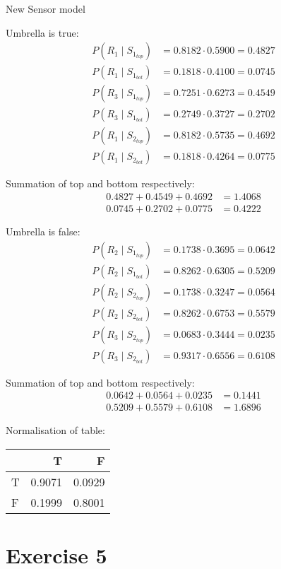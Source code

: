\documentclass[colorlinks=true,linkcolor=blue]{article}
\begin{document}
New Sensor model

Umbrella is true:
\begin{align*}
P(R_1 \mid S_{1_{top}}) &= 0.8182 \cdot 0.5900 = 0.4827\\
P(R_1 \mid S_{1_{bot}}) &= 0.1818 \cdot 0.4100 = 0.0745\\
P(R_3 \mid S_{1_{top}}) &= 0.7251 \cdot 0.6273 = 0.4549\\
P(R_3 \mid S_{1_{bot}}) &= 0.2749 \cdot 0.3727 = 0.2702\\
P(R_1 \mid S_{2_{top}}) &= 0.8182 \cdot 0.5735 = 0.4692\\
P(R_1 \mid S_{2_{bot}}) &= 0.1818 \cdot 0.4264 = 0.0775
\end{align*}

Summation of top and bottom respectively:
\begin{align*}
0.4827 + 0.4549 + 0.4692 &= 1.4068\\
0.0745 + 0.2702 + 0.0775 &= 0.4222
\end{align*}

Umbrella is false:
\begin{align*}
P(R_2 \mid S_{1_{top}}) &= 0.1738 \cdot 0.3695 = 0.0642\\
P(R_2 \mid S_{1_{bot}}) &= 0.8262 \cdot 0.6305 = 0.5209\\
P(R_2 \mid S_{2_{top}}) &= 0.1738 \cdot 0.3247 = 0.0564\\
P(R_2 \mid S_{2_{bot}}) &= 0.8262 \cdot 0.6753 = 0.5579\\
P(R_3 \mid S_{2_{top}}) &= 0.0683 \cdot 0.3444 = 0.0235\\
P(R_3 \mid S_{2_{bot}}) &= 0.9317 \cdot 0.6556 = 0.6108
\end{align*}

Summation of top and bottom respectively:
\begin{align*}
0.0642 + 0.0564 + 0.0235 &= 0.1441\\
0.5209 + 0.5579 + 0.6108 &= 1.6896
\end{align*}

Normalisation of table:
\begin{center}
\begin{tabular}{l|rr}
 & T & F\\
\hline
T & 0.9071 & 0.0929\\
F & 0.1999 & 0.8001\\
\end{tabular}
\end{center}
\section{Exercise 5}
\label{sec-5}
\end{document}
